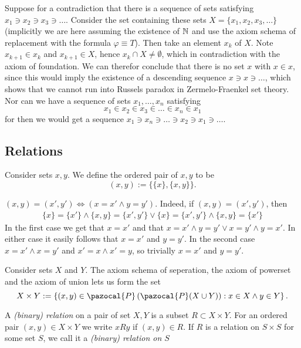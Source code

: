 \begin{example}
    Suppose for a contradiction that there is a sequence of sets satisfying $x_1\ni x_2\ni x_3\ni\dots$. Consider the set containing these sets $X=\{x_1,x_2,x_3,\dots\}$ (implicitly we are here assuming the existence of $\mathbb{N}$ and use the axiom schema of replacement with the formula $\varphi \equiv T$). Then take an element $x_k$ of $X$. Note $x_{k+1}\in x_k$ and $x_{k+1}\in X$, hence $x_k\cap X\neq \emptyset$, which in contradiction with the axiom of foundation. We can therefor conclude that there is no set $x$ with $x\in x$, since this would imply the existence of a descending sequence $x\ni x\ni \dots$, which shows that we cannot run into Russels paradox in Zermelo-Fraenkel set theory. Nor can we have a sequence of sets $x_1,\dots,x_n$ satisfying 
    $$x_1\in x_2\in x_3\in \dots\in x_n\in x_1$$
    for then we would get a sequence $x_1\ni x_n\ni \dots\ni x_2\ni x_1\ni \dots$. 
\end{example}
\subsection{Relations}
\begin{definition}
    Consider sets $x,y$. We define the ordered pair of $x,y$ to be 
    $$(x,y) := \{\{x\},\{x,y\}\}.$$
\end{definition}
\begin{remark}
    $(x,y)=(x',y')\iff (x=x' \wedge y=y')$. Indeed, if $(x,y)=(x',y')$, then 
    \begin{gather*} \{x\} = \{x'\} \wedge \{x,y\} = \{x',y'\} \vee \{x\} = \{x',y'\} \wedge \{x,y\} = \{x'\} 
    \end{gather*}
    In the first case we get that $x=x'$ and that $x=x' \wedge y = y'\vee x= y'\wedge y=x'$. In either case it easily follows that $x=x'$ and $y=y'$. In the second case $x=x' \wedge x=y'$ and $x' = x\wedge x' = y$, so trivially $x=x'$ and $y=y'$. 
\end{remark}
\begin{definition}
    Consider sets $X$ and $Y$. The axiom schema of seperation, the axiom of powerset and the axiom of union lets us form the set
    $$X\times Y := \left\{ (x,y)\in \pazocal{P}\left(\pazocal{P}(X\cup Y)\right) : x\in X \wedge y\in Y\right\}.$$ 
\end{definition}
\begin{definition}
    A \textit{(binary) relation} on a pair of set $X,Y$ is a subset $R\subset X\times Y$. For an ordered pair $(x,y)\in X\times Y$ we write $xRy$ if $(x,y)\in R$. If $R$ is a relation on $S\times S$ for some set $S$, we call it a \textit{(binary) relation on $S$}     
\end{definition}

